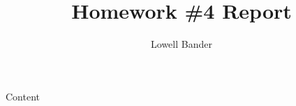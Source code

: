 \documentclass[]{article}
\begin{document}
\title{Homework \#4 Report}
\author{Lowell Bander}
\maketitle

Content
\end{document}
